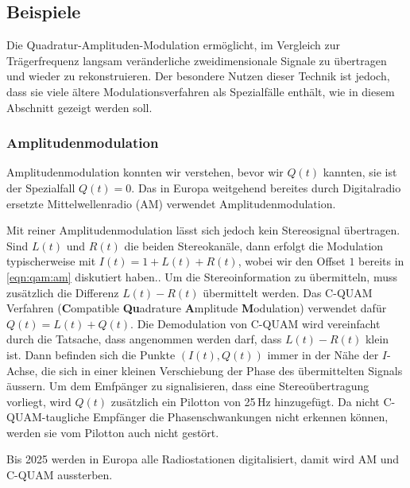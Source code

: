 %
%
%
\subsection{Beispiele
\label{subsection:qam:beispiele}}
Die Quadratur-Amplituden-Modulation ermöglicht, im Vergleich zur
Trägerfrequenz langsam veränderliche zweidimensionale Signale zu
übertragen und wieder zu rekonstruieren.
Der besondere Nutzen dieser Technik ist jedoch, dass sie viele
ältere Modulationsverfahren als Spezialfälle enthält, wie in
diesem Abschnitt gezeigt werden soll.

\subsubsection{Amplitudenmodulation}
Amplitudenmodulation konnten wir verstehen, bevor wir $Q(t)$ kannten,
sie ist der Spezialfall $Q(t)=0$.
Das in Europa weitgehend bereites durch Digitalradio ersetzte 
Mittelwellenradio (AM) verwendet Amplitudenmodulation.

Mit reiner Amplitudenmodulation lässt sich jedoch kein Stereosignal
übertragen.
Sind $L(t)$ und $R(t)$ die beiden Stereokanäle, dann erfolgt die
Modulation typischerweise mit $I(t)=1+L(t)+R(t)$, wobei wir den Offset $1$
bereits in \eqref{eqn:qam:am} diskutiert haben..
Um die Stereoinformation zu übermitteln, muss zusätzlich die Differenz
$L(t)-R(t)$ übermittelt werden.
Das C-QUAM Verfahren ({\bf C}ompatible {\bf Qu}adrature {\bf A}mplitude
{\bf M}odulation) verwendet dafür $Q(t)=L(t)+Q(t)$.
Die Demodulation von C-QUAM wird vereinfacht durch die Tatsache,
dass angenommen werden darf, dass $L(t)-R(t)$ klein ist.
Dann befinden sich die Punkte $(I(t),Q(t))$ immer in der
Nähe der $I$-Achse, die sich in einer kleinen Verschiebung der Phase
des übermittelten Signals äussern.
Um dem Emfpänger zu signalisieren, dass eine Stereoübertragung
vorliegt, wird $Q(t)$ zusätzlich ein Pilotton von 25\,Hz hinzugefügt.
Da nicht C-QUAM-taugliche Empfänger die Phasenschwankungen nicht erkennen
können, werden sie vom Pilotton auch nicht gestört.

Bis 2025 werden in Europa alle Radiostationen digitalisiert, damit
wird AM und C-QUAM aussterben.

